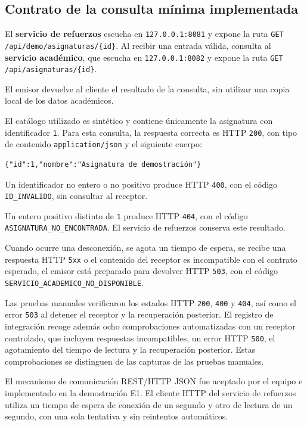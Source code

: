 \subsection{Contrato de la consulta mínima implementada}
El \textbf{servicio de refuerzos} escucha en \texttt{127.0.0.1:8081} y expone la ruta \texttt{GET} \nolinkurl{/api/demo/asignaturas/{id}}. Al recibir una entrada válida, consulta al \textbf{servicio académico}, que escucha en \texttt{127.0.0.1:8082} y expone la ruta \texttt{GET} \nolinkurl{/api/asignaturas/{id}}.

El emisor devuelve al cliente el resultado de la consulta, sin utilizar una copia local de los datos académicos.

El catálogo utilizado es sintético y contiene únicamente la asignatura con identificador \texttt{1}. Para esta consulta, la respuesta correcta es HTTP \texttt{200}, con tipo de contenido \texttt{application/json} y el siguiente cuerpo:

\begin{verbatim}
{"id":1,"nombre":"Asignatura de demostración"}
\end{verbatim}

Un identificador no entero o no positivo produce HTTP \texttt{400}, con el código \texttt{ID\_INVALIDO}, sin consultar al receptor.

Un entero positivo distinto de \texttt{1} produce HTTP \texttt{404}, con el código \nolinkurl{ASIGNATURA_NO_ENCONTRADA}. El servicio de refuerzos conserva este resultado.

Cuando ocurre una desconexión, se agota un tiempo de espera, se recibe una respuesta HTTP \texttt{5xx} o el contenido del receptor es incompatible con el contrato esperado, el emisor está preparado para devolver HTTP \texttt{503}, con el código \texttt{SERVICIO\_ACADEMICO\_NO\_DISPONIBLE}.

Las pruebas manuales verificaron los estados HTTP \texttt{200}, \texttt{400} y \texttt{404}, así como el error \texttt{503} al detener el receptor y la recuperación posterior. El registro de integración recoge además ocho comprobaciones automatizadas con un receptor controlado, que incluyen respuestas incompatibles, un error HTTP \texttt{500}, el agotamiento del tiempo de lectura y la recuperación posterior. Estas comprobaciones se distinguen de las capturas de las pruebas manuales.

El mecanismo de comunicación REST/HTTP JSON fue aceptado por el equipo e implementado en la demostración E1. El cliente HTTP del servicio de refuerzos utiliza un tiempo de espera de conexión de un segundo y otro de lectura de un segundo, con una sola tentativa y sin reintentos automáticos.

